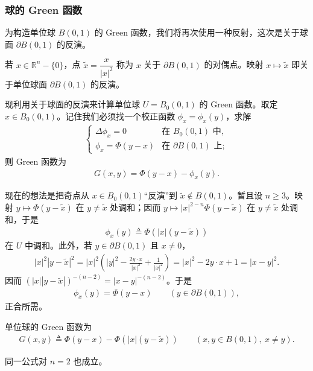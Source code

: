 \documentclass[../../main.tex]{subfiles}
\begin{document}
\subsubsection{球的 Green 函数}

为构造单位球 $B(0,1)$ 的 Green 函数，我们将再次使用一种反射，这次是关于球面 $\partial B(0,1)$ 的反演。

\begin{definition}\label{definition:ch02-inversion}
若 $x\in\mathbb{R}^n-\{0\}$，点 $\widetilde{x}=\dfrac{x}{|x|^2}$ 称为 $x$ 关于 $\partial B(0,1)$ 的对偶点。映射 $x\mapsto\widetilde{x}$ 即关于单位球面 $\partial B(0,1)$ 的反演。
\end{definition}

现利用关于球面的反演来计算单位球 $U=B_0(0,1)$ 的 Green 函数。取定 $x\in B_0(0,1)$。记住我们必须找一个校正函数 $\phi_x=\phi_x(y)$，求解
\begin{align}\label{align:ch02-ball-corrector}
\begin{cases}
\Delta\phi_x=0 & \text{在 }B_0(0,1)\text{ 中},\\
\phi_x=\Phi(y-x) & \text{在 }\partial B(0,1)\text{ 上};
\end{cases}
\end{align}
则 Green 函数为
\begin{align}\label{align:ch02-ball-green-def}
G(x,y)=\Phi(y-x)-\phi_x(y).
\end{align}

现在的想法是把奇点从 $x\in B_0(0,1)$``反演''到 $\widetilde{x}\notin B(0,1)$。暂且设 $n\geqslant 3$。映射 $y\mapsto\Phi(y-\widetilde{x})$ 在 $y\neq\widetilde{x}$ 处调和；因而 $y\mapsto|x|^{2-n}\Phi(y-\widetilde{x})$ 在 $y\neq\widetilde{x}$ 处调和，于是
\begin{align}\label{align:ch02-ball-phi}
\phi_x(y)\triangleq\Phi(|x|(y-\widetilde{x}))
\end{align}
在 $U$ 中调和。此外，若 $y\in\partial B(0,1)$ 且 $x\neq 0$，
\begin{align*}
|x|^2|y-\widetilde{x}|^2=|x|^2\left(|y|^2-\frac{2y\cdot x}{|x|^2}+\frac{1}{|x|^2}\right)=|x|^2-2y\cdot x+1=|x-y|^2.
\end{align*}
因而 $(|x||y-\widetilde{x}|)^{-(n-2)}=|x-y|^{-(n-2)}$。于是
\begin{align}\label{align:ch02-ball-phi-boundary}
\phi_x(y)=\Phi(y-x) \qquad (y\in\partial B(0,1)),
\end{align}
正合所需。

\begin{definition}\label{definition:ch02-green-ball}
单位球的 Green 函数为
\begin{align}\label{align:ch02-ball-green}
G(x,y)\triangleq\Phi(y-x)-\Phi(|x|(y-\widetilde{x})) \qquad (x,y\in B(0,1),\ x\neq y).
\end{align}
\end{definition}
同一公式对 $n=2$ 也成立。
\end{document}
